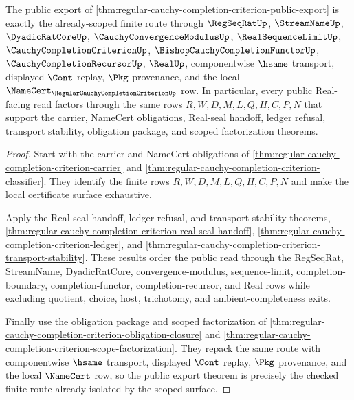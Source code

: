 \begin{theorem}
\label{thm:regular-cauchy-completion-criterion-public-export-checked-route}
The public export of \autoref{thm:regular-cauchy-completion-criterion-public-export} is exactly the already-scoped finite route through $\RegSeqRatUp$, $\StreamNameUp$, $\DyadicRatCoreUp$, $\CauchyConvergenceModulusUp$, $\RealSequenceLimitUp$, $\CauchyCompletionCriterionUp$, $\BishopCauchyCompletionFunctorUp$, $\CauchyCompletionRecursorUp$, $\RealUp$, componentwise $\hsame$ transport, displayed $\Cont$ replay, $\Pkg$ provenance, and the local $\NameCert_{\RegularCauchyCompletionCriterionUp}$ row. In particular, every public Real-facing read factors through the same rows $R,W,D,M,L,Q,H,C,P,N$ that support the carrier, NameCert obligations, Real-seal handoff, ledger refusal, transport stability, obligation package, and scoped factorization theorems.
\end{theorem}
\begin{proof}
Start with the carrier and NameCert obligations of \autoref{thm:regular-cauchy-completion-criterion-carrier} and \autoref{thm:regular-cauchy-completion-criterion-classifier}. They identify the finite rows $R,W,D,M,L,Q,H,C,P,N$ and make the local certificate surface exhaustive.

Apply the Real-seal handoff, ledger refusal, and transport stability theorems, \autoref{thm:regular-cauchy-completion-criterion-real-seal-handoff}, \autoref{thm:regular-cauchy-completion-criterion-ledger}, and \autoref{thm:regular-cauchy-completion-criterion-transport-stability}. These results order the public read through the RegSeqRat, StreamName, DyadicRatCore, convergence-modulus, sequence-limit, completion-boundary, completion-functor, completion-recursor, and Real rows while excluding quotient, choice, host, trichotomy, and ambient-completeness exits.

Finally use the obligation package and scoped factorization of \autoref{thm:regular-cauchy-completion-criterion-obligation-closure} and \autoref{thm:regular-cauchy-completion-criterion-scope-factorization}. They repack the same route with componentwise $\hsame$ transport, displayed $\Cont$ replay, $\Pkg$ provenance, and the local $\NameCert$ row, so the public export theorem is precisely the checked finite route already isolated by the scoped surface.
\end{proof}

